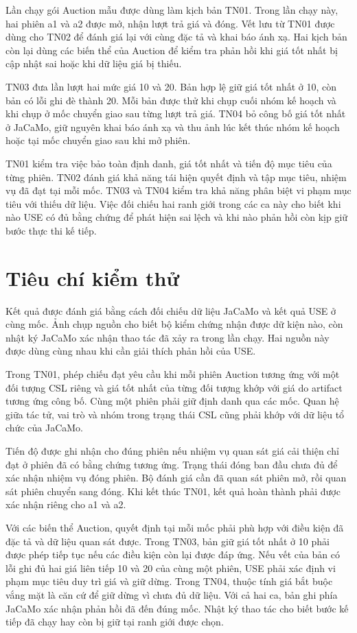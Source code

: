 \documentclass[12pt,a4paper,oneside]{extreport}
\begin{document}
Lần chạy gói Auction mẫu được dùng làm kịch bản TN01. Trong lần chạy này, hai phiên a1 và a2 được mở, nhận lượt trả giá và đóng. Vết lưu từ TN01 được dùng cho TN02 để đánh giá lại với cùng đặc tả và khai báo ánh xạ. Hai kịch bản còn lại dùng các biến thể của Auction để kiểm tra phản hồi khi giá tốt nhất bị cập nhật sai hoặc khi dữ liệu giá bị thiếu.

TN03 đưa lần lượt hai mức giá 10 và 20. Bản hợp lệ giữ giá tốt nhất ở 10, còn bản có lỗi ghi đè thành 20. Mỗi bản được thử khi chụp cuối nhóm kế hoạch và khi chụp ở mốc chuyển giao sau từng lượt trả giá. TN04 bỏ công bố giá tốt nhất ở JaCaMo, giữ nguyên khai báo ánh xạ và thu ảnh lúc kết thúc nhóm kế hoạch hoặc tại mốc chuyển giao sau khi mở phiên.

TN01 kiểm tra việc bảo toàn định danh, giá tốt nhất và tiến độ mục tiêu của từng phiên. TN02 đánh giá khả năng tái hiện quyết định và tập mục tiêu, nhiệm vụ đã đạt tại mỗi mốc. TN03 và TN04 kiểm tra khả năng phân biệt vi phạm mục tiêu với thiếu dữ liệu. Việc đối chiếu hai ranh giới trong các ca này cho biết khi nào USE có đủ bằng chứng để phát hiện sai lệch và khi nào phản hồi còn kịp giữ bước thực thi kế tiếp.

\section{Tiêu chí kiểm thử}\label{sec:3-3}

Kết quả được đánh giá bằng cách đối chiếu dữ liệu JaCaMo và kết quả USE ở cùng mốc. Ảnh chụp nguồn cho biết bộ kiểm chứng nhận được dữ kiện nào, còn nhật ký JaCaMo xác nhận thao tác đã xảy ra trong lần chạy. Hai nguồn này được dùng cùng nhau khi cần giải thích phản hồi của USE.

Trong TN01, phép chiếu đạt yêu cầu khi mỗi phiên Auction tương ứng với một đối tượng CSL riêng và giá tốt nhất của từng đối tượng khớp với giá do artifact tương ứng công bố. Cùng một phiên phải giữ định danh qua các mốc. Quan hệ giữa tác tử, vai trò và nhóm trong trạng thái CSL cũng phải khớp với dữ liệu tổ chức của JaCaMo.

Tiến độ được ghi nhận cho đúng phiên nếu nhiệm vụ quan sát giá cải thiện chỉ đạt ở phiên đã có bằng chứng tương ứng. Trạng thái đóng ban đầu chưa đủ để xác nhận nhiệm vụ đóng phiên. Bộ đánh giá cần đã quan sát phiên mở, rồi quan sát phiên chuyển sang đóng. Khi kết thúc TN01, kết quả hoàn thành phải được xác nhận riêng cho a1 và a2.

Với các biến thể Auction, quyết định tại mỗi mốc phải phù hợp với điều kiện đã đặc tả và dữ liệu quan sát được. Trong TN03, bản giữ giá tốt nhất ở 10 phải được phép tiếp tục nếu các điều kiện còn lại được đáp ứng. Nếu vết của bản có lỗi ghi đủ hai giá liên tiếp 10 và 20 của cùng một phiên, USE phải xác định vi phạm mục tiêu duy trì giá và giữ dừng. Trong TN04, thuộc tính giá bắt buộc vắng mặt là căn cứ để giữ dừng vì chưa đủ dữ liệu. Với cả hai ca, bản ghi phía JaCaMo xác nhận phản hồi đã đến đúng mốc. Nhật ký thao tác cho biết bước kế tiếp đã chạy hay còn bị giữ tại ranh giới được chọn.
\end{document}
